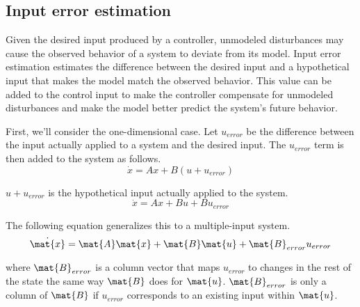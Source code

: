 \subsection{Input error estimation}
\label{subsec:input_error_estimation}

Given the desired \gls{input} produced by a \gls{controller}, unmodeled
\glspl{disturbance} may cause the observed behavior of a \gls{system} to deviate
from its \gls{model}. Input error estimation estimates the difference between
the desired \gls{input} and a hypothetical \gls{input} that makes the
\gls{model} match the observed behavior. This value can be added to the
\gls{control input} to make the \gls{controller} compensate for unmodeled
\glspl{disturbance} and make the \gls{model} better predict the \gls{system}'s
future behavior.

First, we'll consider the one-dimensional case. Let $u_{error}$ be the
difference between the \gls{input} actually applied to a \gls{system} and the
desired \gls{input}. The $u_{error}$ term is then added to the \gls{system} as
follows.
\begin{equation*}
  \dot{x} = Ax + B\left(u + u_{error}\right)
\end{equation*}

$u + u_{error}$ is the hypothetical \gls{input} actually applied to the
\gls{system}.
\begin{equation*}
  \dot{x} = Ax + Bu + Bu_{error}
\end{equation*}

The following equation generalizes this to a multiple-input \gls{system}.
\begin{equation*}
  \dot{\mat{x}} = \mat{A}\mat{x} + \mat{B}\mat{u} + \mat{B}_{error}u_{error}
\end{equation*}

where $\mat{B}_{error}$ is a column vector that maps $u_{error}$ to changes in
the rest of the \gls{state} the same way $\mat{B}$ does for $\mat{u}$.
$\mat{B}_{error}$ is only a column of $\mat{B}$ if $u_{error}$ corresponds to an
existing \gls{input} within $\mat{u}$.

